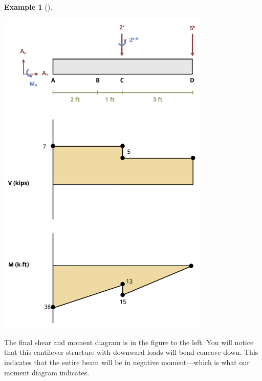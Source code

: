 \documentclass[
  letterpaper,
  DIV=11,
  numbers=noendperiod]{scrreprt}
\theoremstyle{definition}
\newtheorem{example}{Example}[chapter]
\theoremstyle{remark}
\begin{document}
\begin{tcolorbox}
\begin{example}[]
\begin{tcolorbox}
\begin{center}
\includegraphics[width=4.02083in,height=\textheight]{images/CH7 PNGs/example 7.4 part 7.png}
\end{center}

The final shear and moment diagram is in the figure to the left. You
will notice that this cantilever structure with downward loads will bend
concave down. This indicates that the entire beam will be in negative
moment---which is what our moment diagram indicates.

\end{tcolorbox}

\end{example}

\end{tcolorbox}
\end{document}
